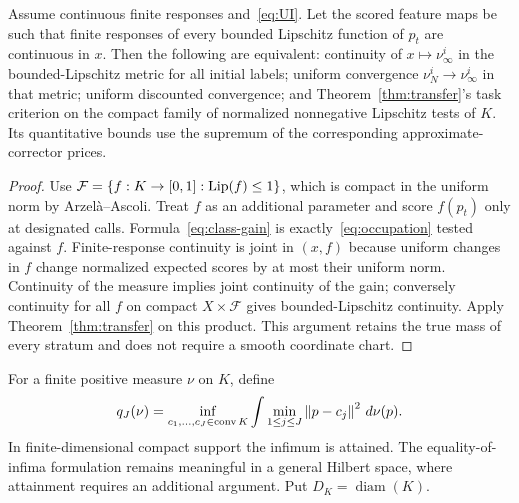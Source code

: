 \begin{theorem}\label{thm:occupation}
Assume continuous finite responses and~\eqref{eq:UI}. Let the scored feature maps be such that finite responses of every bounded Lipschitz function of $p_t$ are continuous in $x$. Then the following are equivalent: continuity of $x\mapsto\nu_\infty^i$ in the bounded-Lipschitz metric for all initial labels; uniform convergence $\nu_N^i\to\nu_\infty^i$ in that metric; uniform discounted convergence; and Theorem~\ref{thm:transfer}'s task criterion on the compact family of normalized nonnegative Lipschitz tests of $K$. Its quantitative bounds use the supremum of the corresponding approximate-corrector prices.
\end{theorem}
\begin{proof}
Use $\mathcal F=\{f:K\to[0,1]:\operatorname{Lip}(f)\le1\}$, which is compact in the uniform norm by Arzel\`a--Ascoli. Treat $f$ as an additional parameter and score $f(p_t)$ only at designated calls. Formula~\eqref{eq:class-gain} is exactly~\eqref{eq:occupation} tested against $f$. Finite-response continuity is joint in $(x,f)$ because uniform changes in $f$ change normalized expected scores by at most their uniform norm. Continuity of the measure implies joint continuity of the gain; conversely continuity for all $f$ on compact $X\times\mathcal F$ gives bounded-Lipschitz continuity. Apply Theorem~\ref{thm:transfer} on this product. This argument retains the true mass of every stratum and does not require a smooth coordinate chart.
\end{proof}

For a finite positive measure $\nu$ on $K$, define
\begin{equation}\label{eq:quantization}
 q_J(\nu)=\inf_{c_1,\ldots,c_J\in\operatorname{conv} K}
       \int\min_{1\le j\le J}\left\lVert p-c_j\right\rVert^2\,d\nu(p).
\end{equation}
In finite-dimensional compact support the infimum is attained. The equality-of-infima formulation remains meaningful in a general Hilbert space, where attainment requires an additional argument. Put $D_K=\operatorname{diam}(K)$.

